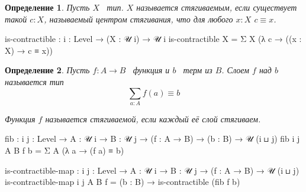 \documentclass{article}[12pt]
\newtheorem{definition}{Определение}
\newcommand{\dash}{\textemdash\ }
\begin{document}
\begin{definition}
    \label{ContractibleTypeDefinition}
    Пусть $X$ \dash тип. $X$ называется стягиваемым, если существует такой $c : X$, называемый
    центром стягивания, что для любого $x : X$ $c \equiv x$.
\end{definition}
\begin{code}
is-contractible : {i : Level} → (X : 𝒰 i) → 𝒰 i
is-contractible X = Σ X (λ c → ((x : X) → c ≡ x))
\end{code}

\begin{definition}
    \label{ContractibleMapDefinition}
    Пусть $f : A \rightarrow B$ \dash функция и $b$ \dash терм из $B$.
    Слоем $f$ над $b$ называется тип
    $$\sum_{a : A} f(a) \equiv b$$

    Функция $f$ называется стягиваемой, если каждый её слой стягиваем.
\end{definition}
\begin{code}
fib : {i j : Level} → {A : 𝒰 i} → {B : 𝒰 j} 
      → (f : A → B) → (b : B)
      → 𝒰 (i ⊔ j)
fib {i} {j} {A} {B} f b = Σ A (λ a → (f a) ≡ b)

is-contractible-map : {i j : Level} → {A : 𝒰 i} → {B : 𝒰 j}
                      → (f : A → B)
                      → 𝒰 (i ⊔ j)
is-contractible-map {i} {j} {A} {B} f = (b : B) → is-contractible (fib f b)
\end{code}
\end{document}
